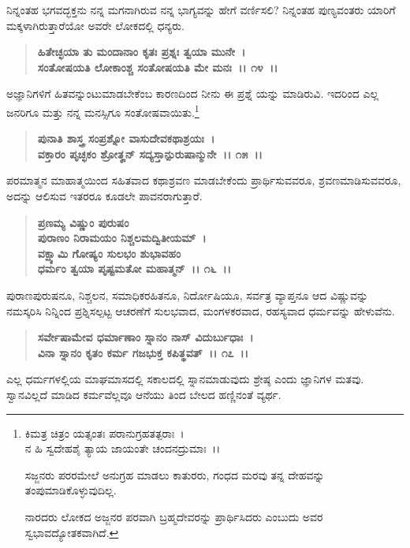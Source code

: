ನಿನ್ನಂತಹ ಭಗವದ್ಭಕ್ತನು ನನ್ನ ಮಗನಾಗಿರುವ ನನ್ನ ಭಾಗ್ಯವನ್ನು ಹೇಗೆ ವರ್ಣಿಸಲಿ? ನಿನ್ನಂತಹ ಪುಣ್ಯವಂತರು ಯಾರಿಗೆ ಮಕ್ಕಳಾಗಿರುತ್ತಾರೆಯೋ ಅವರೇ ಲೋಕದಲ್ಲಿ ಧನ್ಯರು.

\begin{verse}
\textbf{ಹಿತೇಚ್ಛಯಾ ತು ಮಂದಾನಾಂ ಕೃತಃ ಪ್ರಶ್ನಃ ತ್ವಯಾ ಮುನೇ~।}\\\textbf{ಸಂತೋಷಯತಿ ಲೋಕಾಂಶ್ಚ ಸಂತೋಷಯತಿ ಮೇ ಮನಃ~।। ೧೪~।।}
\end{verse}

ಅಜ್ಞಾನಿಗಳಿಗೆ ಹಿತವನ್ನುಂಟುಮಾಡಬೇಕೆಂಬ ಕಾರಣದಿಂದ ನೀನು ಈ ಪ್ರಶ್ನೆ ಯನ್ನು ಮಾಡಿರುವಿ. ಇದರಿಂದ ಎಲ್ಲ ಜನರಿಗೂ ಮತ್ತು ನನ್ನ ಮನಸ್ಸಿಗೂ ಸಂತೋಷವಾಯಿತು.\footnote{\phantom{*} ಕಿಮತ್ರ ಚಿತ್ರಂ ಯತ್ಸಂತಃ ಪರಾನುಗ್ರಹತತ್ಪರಾಃ~।\\ ನ ಹಿ ಸ್ವದೇಹಶೈ ತ್ಯಾಯ ಜಾಯಂತೇ ಚಂದನದ್ರುಮಾಃ~।।

ಸಜ್ಜನರು ಪರರಮೇಲೆ ಅನುಗ್ರಹ ಮಾಡಲು ಕಾತುರರು, ಗಂಧದ ಮರವು ತನ್ನ ದೇಹವನ್ನು ತಂಪುಮಾಡಿಕೊಳ್ಳುವು\-ದಿಲ್ಲ.

ನಾರದರು ಲೋಕದ ಅಜ್ಜನರ ಪರವಾಗಿ ಬ್ರಹ್ಮದೇವರನ್ನು ಪ್ರಾರ್ಥಿಸಿದರು ಎಂಬುದು ಅವರ ಸ್ವಭಾವದ್ಯೋತಕ\-ವಾಗಿದೆ.}

\begin{verse}
\textbf{ಪುನಾತಿ ಶಾಸ್ತ್ರ ಸಂಪ್ರಶ್ನೋ ವಾಸುದೇವಕಥಾಶ್ರಯಃ~।}\\\textbf{ವಕ್ತಾರಂ ಪೃಚ್ಛಕಂ ಶ್ರೋತೄನ್ ಸದ್ಯಸ್ತಾನ್ಪುರುಷಾನ್ಮುನೇ~।। ೧೫~।।}
\end{verse}

ಪರಮಾತ್ಮನ ಮಾಹಾತ್ಮಯಿಂದ ಸಹಿತವಾದ ಕಥಾಶ್ರವಣ ಮಾಡಬೇಕೆಂದು ಪ್ರಾರ್ಥಿಸು\-ವವರೂ, ಶ್ರವಣಮಾಡಿಸುವವರೂ, ಅದನ್ನು ಆಲಿಸುವ ಇತರರೂ ಕೂಡಲೇ ಪಾವನ\-ರಾಗುತ್ತಾರೆ.

\begin{verse}
\textbf{ಪ್ರಣಮ್ಯ ವಿಷ್ಣುಂ ಪುರುಷಂ} \\\textbf{ಪುರಾಣಂ ನಿರಾಮಯಂ ನಿಶ್ಚಲಮದ್ವಿತೀಯಮ್~।}\\\textbf{ವಕ್ಷ್ಯಾಮಿ ಗೋಷ್ಯಂ ಸುಲಭಂ ಶುಭಾವಹಂ}\\\textbf{ಧರ್ಮಂ ತ್ವಯಾ ಪೃಷ್ಟಮತೋ ಮಹಾತ್ಮನ್~।। ೧೬~।।}
\end{verse}

ಪುರಾಣಪುರುಷನೂ, ನಿಶ್ಚಲನ, ಸಮಾಧಿಕರಹಿತನೂ, ನಿರ್ದೋಷಿಯೂ, ಸರ್ವತ್ರ ವ್ಯಾಪ್ತನೂ ಆದ ವಿಷ್ಣುವನ್ನು ನಮಸ್ಕರಿಸಿ ನಿನ್ನಿಂದ ಪ್ರಶ್ನಿಸಲ್ಪಟ್ಟ ಆಚರಣೆಗೆ ಸುಲಭವಾದ, ಮಂಗಳಕರವಾದ, ರಹಸ್ಯವಾದ ಧರ್ಮವನ್ನು ಹೇಳುವೆನು.

\begin{verse}
\textbf{ಸರ್ವೇಷಾಮೇವ ಧರ್ಮಾಣಾಂ ಸ್ನಾನಂ ನಾಸ್‌ ವಿದುರ್ಬುಧಾಃ~।}\\\textbf{ವಿನಾ ಸ್ನಾನಂ ಕೃತಂ ಕರ್ಮ ಗಜಭುಕ್ತ ಕಪಿತ್ಥವತ್~।। ೧೭~।।}
\end{verse}

ಎಲ್ಲ ಧರ್ಮಗಳಲ್ಲಿಯ ಮಾಘಮಾಸದಲ್ಲಿ ಸಕಾಲದಲ್ಲಿ ಸ್ನಾನಮಾಡುವುದು ಶ್ರೇಷ್ಠ ಎಂದು ಜ್ಞಾನಿಗಳ ಮತವು. ಸ್ವಾನವಿಲ್ಲದೆ ಮಾಡಿದ ಕರ್ಮವೆಲ್ಲವೂ ಆನೆಯು ತಿಂದ ಬೇಲದ ಹಣ್ಣಿನಂತೆ ವ್ಯರ್ಥ.

